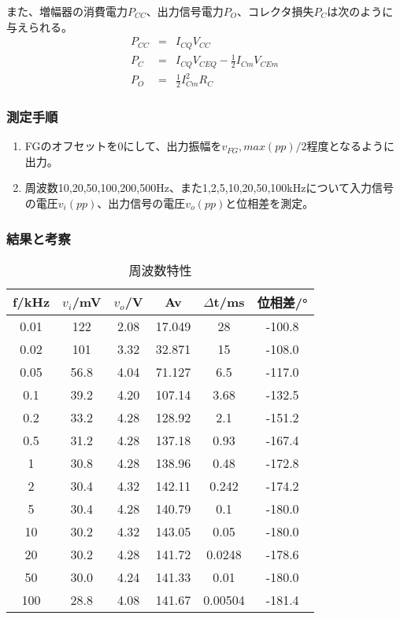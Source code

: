 \documentclass[11pt,a4j,titlepage]{jsarticle}
\begin{document}
  また、増幅器の消費電力$P_{CC}$、出力信号電力$P_O$、コレクタ損失$P_C$は次のように与えられる。
  \begin{eqnarray}
   P_{CC} &=& I_{CQ}V_{CC} \\
   P_C &=& I_{CQ}V_{CEQ} - \frac{1}{2} I_{Cm}V_{CEm} \\
   P_O &=& \frac{1}{2} I_{Cm}^2 R_C
  \end{eqnarray}

   
  
   \subsubsection{測定手順}
  
  \begin{enumerate}
   \item FGのオフセットを0にして、出力振幅を$v_{FG},max(pp)/2$程度となるように出力。
   \item 周波数10,20,50,100,200,500Hz、また1,2,5,10,20,50,100kHzについて入力信号の電圧$v_i(pp)$、出力信号の電圧$v_o(pp)$と位相差を測定。
  \end{enumerate}

  
  \clearpage
  
   \subsubsection{結果と考察}
   
 
 \begin{table}[htb]
  \begin{center}
    \caption{周波数特性}
    \begin{tabular}{cccccc} \toprule
f/kHz	&	$v_i$/mV	&	$v_o$/V	&	Av	&	$\Delta$t/ms	&	位相差/°	\\ \midrule
0.01	&	122	&	2.08	&	17.049	&	28	&	-100.8	\\
0.02	&	101	&	3.32	&	32.871	&	15	&	-108.0	\\
0.05	&	56.8	&	4.04	&	71.127	&	6.5	&	-117.0	\\
0.1	&	39.2	&	4.20	&	107.14	&	3.68	&	-132.5	\\
0.2	&	33.2	&	4.28	&	128.92	&	2.1	&	-151.2	\\
0.5	&	31.2	&	4.28	&	137.18	&	0.93	&	-167.4	\\
1	&	30.8	&	4.28	&	138.96	&	0.48	&	-172.8	\\
2	&	30.4	&	4.32	&	142.11	&	0.242	&	-174.2	\\
5	&	30.4	&	4.28	&	140.79	&	0.1	&	-180.0	\\
10	&	30.2	&	4.32	&	143.05	&	0.05	&	-180.0	\\
20	&	30.2	&	4.28	&	141.72	&	0.0248	&	-178.6	\\
50	&	30.0	&	4.24	&	141.33	&	0.01	&	-180.0	\\
100	&	28.8	&	4.08	&	141.67	&	0.00504	&	-181.4	\\ \bottomrule
    \end{tabular}
    \label{tab:price}
  \end{center}
\end{table}
\end{document}
